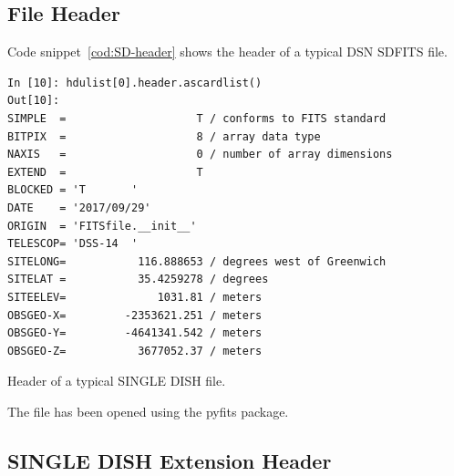\documentclass[letterpaper,11pt]{book}
\begin{document}
\subsection{File Header}

Code snippet~\ref{cod:SD-header} shows the header of a typical DSN SDFITS file.
\begin{code}[h!tb]
\begin{center}
{\scriptsize \begin{verbatim}
In [10]: hdulist[0].header.ascardlist()
Out[10]: 
SIMPLE  =                    T / conforms to FITS standard                      
BITPIX  =                    8 / array data type                                
NAXIS   =                    0 / number of array dimensions                     
EXTEND  =                    T                                                  
BLOCKED = 'T       '                                                            
DATE    = '2017/09/29'                                                          
ORIGIN  = 'FITSfile.__init__'                                                   
TELESCOP= 'DSS-14  '                                                            
SITELONG=           116.888653 / degrees west of Greenwich                      
SITELAT =           35.4259278 / degrees                                        
SITEELEV=              1031.81 / meters                                         
OBSGEO-X=         -2353621.251 / meters                                         
OBSGEO-Y=         -4641341.542 / meters                                         
OBSGEO-Z=           3677052.37 / meters\end{verbatim}
}\caption{\label{cod:SD-header}Header of a typical SINGLE DISH file.}
\end{center}
\end{code}
The file has been opened using the {\ttfamily pyfits} package.

\subsection{SINGLE DISH Extension Header}
\end{document}
